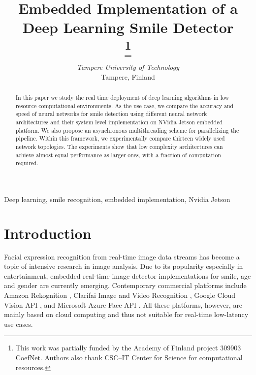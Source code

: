 \documentclass[conference]{IEEEtran}
\begin{document}
\title{Embedded Implementation of a Deep Learning Smile Detector\\
\thanks{This work was partially funded by the Academy of Finland
project 309903 CoefNet. Authors also thank CSC--IT Center for Science for computational resources.}
}

\author{ 
\textit{Tampere University of Technology}\\
Tampere, Finland}

\maketitle

\begin{abstract}
In this paper we study the real time deployment of deep learning algorithms in low resource computational environments. As the use case, we compare the accuracy and speed of neural networks for smile detection using different neural network architectures and their system level implementation on NVidia Jetson embedded platform. We also propose an asynchronous multithreading scheme for parallelizing the pipeline. Within this framework, we experimentally compare thirteen widely used network topologies. The experiments show that low complexity architectures can achieve almost equal performance as larger ones, with a fraction of computation required.
\end{abstract}

\begin{IEEEkeywords}
Deep learning, smile recognition, embedded implementation, Nvidia Jetson
\end{IEEEkeywords}

\section{Introduction}

 Facial expression recognition from real-time image data streams has become a topic of intensive research in image analysis. Due to its popularity especially in entertainment, embedded real-time image detector implementations for smile, age and gender are currently emerging. Contemporary commercial platforms include Amazon Rekognition \cite{a1}, Clarifai Image and Video Recognition \cite{a2}, Google Cloud Vision API \cite{a3}, and Microsoft Azure Face API \cite{a4}. All these platforms, however, are mainly based on cloud computing and thus not suitable for real-time low-latency use cases.
 
\end{document}
